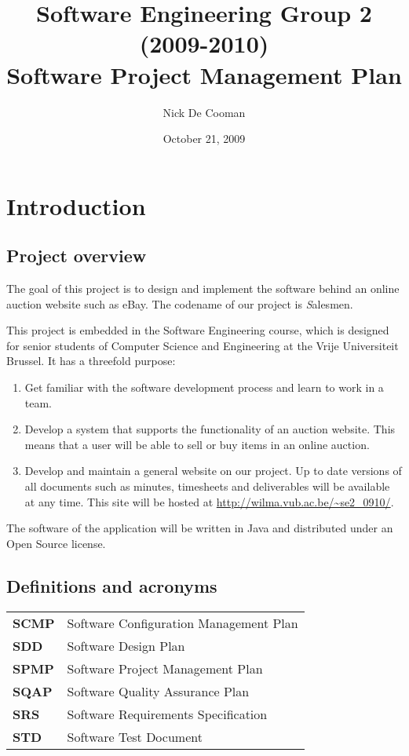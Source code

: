 \documentclass[a4paper, 12pt]{report}
\title{Software Engineering Group 2 (2009-2010) \\Software Project Management Plan}
\author{Nick De Cooman}
\date {October 21, 2009}
\begin{document}
	
	\maketitle
	
	\setcounter{tocdepth}{1}	
	\tableofcontents
	
	\chapter{Introduction}
	
		\section{Project overview}
		
			The goal of this project is to design and implement the software 
			behind an online auction website such as eBay. The codename of our project 
			is {\emph Salesmen}. 

			This project is embedded in the Software Engineering course, 
			which is designed for senior students of Computer Science and Engineering 
			at the Vrije Universiteit Brussel. It has a threefold purpose:
			
			\begin{enumerate}
				\item Get familiar with the software development process and learn to work
				in a team.
				
				\item Develop a system that supports the functionality of an auction website. 
				This means that a user will be able to sell or buy items in an online auction. 
				
				\item Develop and maintain a general website on our project. Up to date 
				versions of all documents such as minutes, timesheets and deliverables will be 
				available at any time. This site will be hosted at
				\url{http://wilma.vub.ac.be/~se2_0910/}.
			\end{enumerate}	
			
			The software of the application will be written in Java and 
			distributed under an Open Source license.
			
		\section{Definitions and acronyms}
		
			\begin{tabular}{l l}
				
				\textbf{SCMP} & Software Configuration Management Plan \\
				\textbf{SDD} & Software Design Plan \\
				\textbf{SPMP} & Software Project Management Plan \\
				\textbf{SQAP} & Software Quality Assurance Plan \\
				\textbf{SRS} & Software Requirements Specification \\
				\textbf{STD} & Software Test Document \\
				
			\end{tabular}	
		
\end{document}
